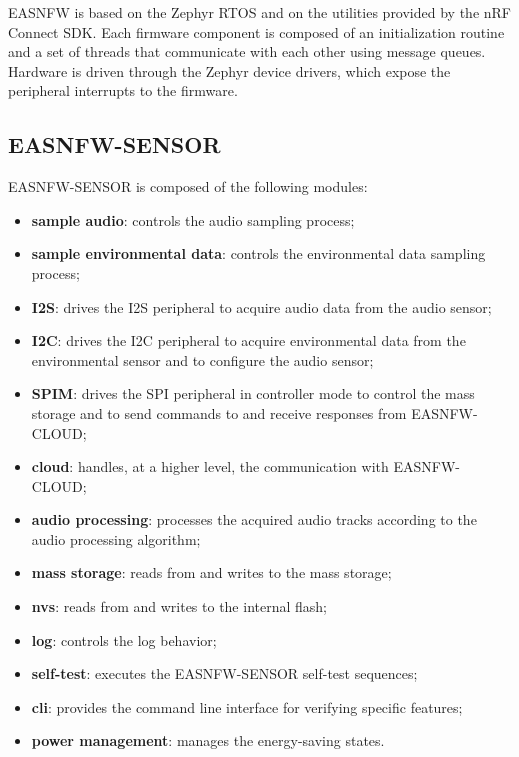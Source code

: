 \documentclass[11pt,a4paper]{article}
\begin{document}
EASNFW is based on the Zephyr RTOS and on the utilities provided by the nRF
Connect SDK. Each firmware component is composed of an initialization routine
and a set of threads that communicate with each other using message queues.
Hardware is driven through the Zephyr device drivers, which expose the
peripheral interrupts to the firmware.

\subsection{EASNFW-SENSOR}

EASNFW-SENSOR is composed of the following modules:

\begin{itemize}
    \item \textbf{sample audio}: controls the audio sampling process;
    \item \textbf{sample environmental data}: controls the environmental data
          sampling process;
    \item \textbf{I2S}: drives the I2S peripheral to acquire audio data from
          the audio sensor;
    \item \textbf{I2C}: drives the I2C peripheral to acquire environmental
          data from the environmental sensor and to configure the audio
          sensor;
    \item \textbf{SPIM}: drives the SPI peripheral in controller mode to
          control the mass storage and to send commands to and receive
          responses from EASNFW-CLOUD;
    \item \textbf{cloud}: handles, at a higher level, the communication with
          EASNFW-CLOUD;
    \item \textbf{audio processing}: processes the acquired audio tracks
          according to the audio processing algorithm;
    \item \textbf{mass storage}: reads from and writes to the mass storage;
    \item \textbf{nvs}: reads from and writes to the internal flash;
    \item \textbf{log}: controls the log behavior;
    \item \textbf{self-test}: executes the EASNFW-SENSOR self-test sequences;
    \item \textbf{cli}: provides the command line interface for verifying
          specific features;
    \item \textbf{power management}: manages the energy-saving states.
\end{itemize}
\end{document}
